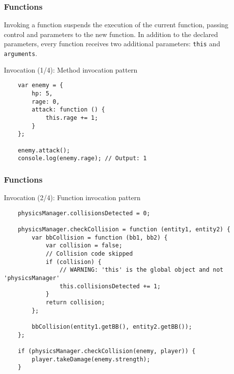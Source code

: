 \begin{frame}[fragile]
  \frametitle{Functions}

  Invoking a function suspends the execution of the current function, passing control and parameters to the new function. In addition to the declared parameters, every function receives two additional parameters: \texttt{this} and \texttt{arguments}.

  \pause

  \begin{block}{Invocation (1/4): Method invocation pattern}
    {\scriptsize
    \begin{verbatim}
    var enemy = {
        hp: 5,
        rage: 0,
        attack: function () {
            this.rage += 1;
        }
    };

    enemy.attack();
    console.log(enemy.rage); // Output: 1
    \end{verbatim}
    }
  \end{block}
\end{frame}

\begin{frame}[fragile]
  \frametitle{Functions}

  \begin{block}{Invocation (2/4): Function invocation pattern}
    {\scriptsize
    \begin{verbatim}
    physicsManager.collisionsDetected = 0;

    physicsManager.checkCollision = function (entity1, entity2) {
        var bbCollision = function (bb1, bb2) {
            var collision = false;
            // Collision code skipped
            if (collision) {
                // WARNING: 'this' is the global object and not 'physicsManager'
                this.collisionsDetected += 1;
            }
            return collision;
        };

        bbCollision(entity1.getBB(), entity2.getBB());
    };

    if (physicsManager.checkCollision(enemy, player)) {
        player.takeDamage(enemy.strength);
    }
    \end{verbatim}
    }
  \end{block}
\end{frame}

